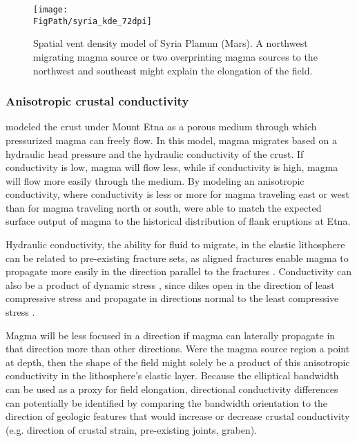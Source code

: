 \begin{figure}
\centering
\texttt{[image: \\FigPath/syria\_kde\_72dpi]}
\caption[Spatial vent density model of Syria Planum (Mars)]{Spatial vent density model of Syria Planum (Mars). A northwest migrating magma source or two overprinting magma sources to the northwest and southeast might explain the elongation of the field.}
\label{fig_syriakde}
\end{figure}


\subsubsection{Anisotropic crustal conductivity}
\citet{bonafede1998porous} modeled the crust under Mount Etna as a porous medium through which pressurized magma can freely flow. In this model, magma migrates based on a hydraulic head pressure and the hydraulic conductivity of the crust. If conductivity is low, magma will flow less, while if conductivity is high, magma will flow more easily through the medium. By modeling an anisotropic conductivity, where conductivity is less or more for magma traveling east or west than for magma traveling north or south, \citet{bonafede1998porous} were able to match the expected surface output of magma to the historical distribution of flank eruptions at Etna. 

Hydraulic conductivity, the ability for fluid to migrate, in the elastic lithosphere can be related to pre-existing fracture sets, as aligned fractures enable magma to propagate more easily in the direction parallel to the fractures \citep{delaney1986field}. Conductivity can also be a product of dynamic stress \citep{germa2013tectonic}, since dikes open in the direction of least compressive stress and propagate in directions normal to the least compressive stress \citep{rubin1995propagation}. 

Magma will be less focused in a direction if magma can laterally propagate in that direction more than other directions. Were the magma source region a point at depth, then the shape of the field might solely be a product of this anisotropic conductivity in the lithosphere's elastic layer. Because the elliptical bandwidth can be used as a proxy for field elongation, directional conductivity differences can potentially be identified by comparing the bandwidth orientation to the direction of geologic features that would increase or decrease crustal conductivity (e.g. direction of crustal strain, pre-existing joints, graben). 

